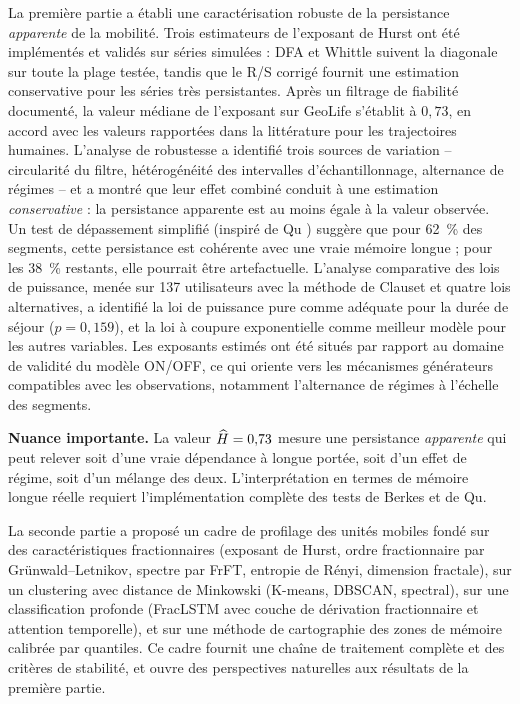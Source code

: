 La première partie a établi une caractérisation robuste de la persistance \emph{apparente} de la mobilité. Trois estimateurs de l'exposant de Hurst ont été implémentés et validés sur séries simulées : DFA et Whittle suivent la diagonale sur toute la plage testée, tandis que le R/S corrigé fournit une estimation conservative pour les séries très persistantes. Après un filtrage de fiabilité documenté, la valeur médiane de l'exposant sur GeoLife s'établit à $0{,}73$, en accord avec les valeurs rapportées dans la littérature pour les trajectoires humaines. L'analyse de robustesse a identifié trois sources de variation -- circularité du filtre, hétérogénéité des intervalles d'échantillonnage, alternance de régimes -- et a montré que leur effet combiné conduit à une estimation \emph{conservative} : la persistance apparente est au moins égale à la valeur observée. Un test de dépassement simplifié (inspiré de Qu \cite{qu2011}) suggère que pour 62~\% des segments, cette persistance est cohérente avec une vraie mémoire longue ; pour les 38~\% restants, elle pourrait être artefactuelle. L'analyse comparative des lois de puissance, menée sur 137 utilisateurs avec la méthode de Clauset et quatre lois alternatives, a identifié la loi de puissance pure comme adéquate pour la durée de séjour ($p = 0{,}159$), et la loi à coupure exponentielle comme meilleur modèle pour les autres variables. Les exposants estimés ont été situés par rapport au domaine de validité du modèle ON/OFF, ce qui oriente vers les mécanismes générateurs compatibles avec les observations, notamment l'alternance de régimes à l'échelle des segments.

\medskip
\textbf{Nuance importante.} La valeur $\widehat{H} = 0{,}73$ mesure une persistance \emph{apparente} qui peut relever soit d'une vraie dépendance à longue portée, soit d'un effet de régime, soit d'un mélange des deux. L'interprétation en termes de mémoire longue réelle requiert l'implémentation complète des tests de Berkes et de Qu.

\medskip
La seconde partie a proposé un cadre de profilage des unités mobiles fondé sur des caractéristiques fractionnaires (exposant de Hurst, ordre fractionnaire par Grünwald--Letnikov, spectre par FrFT, entropie de Rényi, dimension fractale), sur un clustering avec distance de Minkowski (K-means, DBSCAN, spectral), sur une classification profonde (FracLSTM avec couche de dérivation fractionnaire et attention temporelle), et sur une méthode de cartographie des zones de mémoire calibrée par quantiles. Ce cadre fournit une chaîne de traitement complète et des critères de stabilité, et ouvre des perspectives naturelles aux résultats de la première partie.

